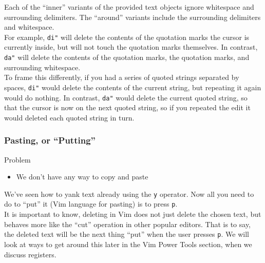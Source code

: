 \documentclass{beamer}
\begin{document}
\begin{frame}[fragile]
    Each of the \enquote{inner} variants of the provided text objects ignore whitespace and surrounding delimiters. The \enquote{around} variants include the surrounding delimiters and whitespace. \\
    \vspace{0.5cm}
    For example, \verb+di"+ will delete the contents of the quotation marks the cursor is currently inside, but will not touch the quotation marks themselves. In contrast, \verb+da"+ will delete the contents of the quotation marks, the quotation marks, and surrounding whitespace. \\
    \vspace{0.5cm}
    To frame this differently, if you had a series of quoted strings separated by spaces, \verb+di"+ would delete the contents of the current string, but repeating it again would do nothing. In contrast, \verb+da"+ would delete the current quoted string, so that the cursor is now on the next quoted string, so if you repeated the edit it would deleted each quoted string in turn.
\end{frame}

\begin{frame}[fragile]
    \frametitle{Pasting, or \enquote{Putting}}
    \begin{block}{Problem}
	\begin{itemize}
	    \item We don't have any way to copy and paste
	\end{itemize}
    \end{block}
    We've seen how to yank text already using the \verb+y+ operator. Now all you need to do to \enquote{put} it (Vim language for pasting) is to press \verb+p+.\\
    \vspace{0.5cm}
    It is important to know, deleting in Vim does not just delete the chosen text, but behaves more like the \enquote{cut} operation in other popular editors. That is to say, the deleted text will be the next thing \enquote{put} when the user presses \verb+p+. We will look at ways to get around this later in the Vim Power Tools section, when we discuss registers.
\end{frame}
\end{document}
